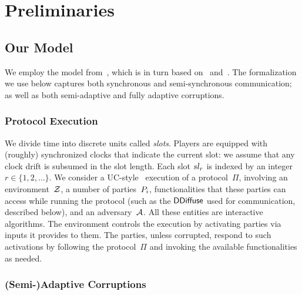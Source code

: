 \section{Preliminaries}


\subsection{Our Model}
\label{sec:model}

We employ the model from~\cite{EC:DGKR18}, which is in turn based
on~\cite{C:KRDO17} and~\cite{EC:GarKiaLeo15}.
The formalization we use below captures both synchronous and semi-syn\-chronous
communication; as well as both semi-adaptive and fully adaptive corruptions.

\subsubsection{Protocol Execution}
\label{sec:prelim-exec}

We divide time into discrete units called
\emph{slots}. %
Players are equipped with (roughly) synchronized clocks that
indicate the current slot: we assume that any clock drift is subsumed in the
slot length.  Each slot $sl_r$ is indexed by an integer $r \in \{1,2,\ldots
\}$.
We consider a UC-style~\cite{FOCS:Canetti01} execution of a protocol~$\Pi$,
involving an environment~$\mathcal{Z}$, a number of
parties~$P_i$, functionalities that these parties can access while running
the protocol (such as the $\mathsf{DDiffuse}$ used for communication, described below), and
an adversary~$\mathcal{A}$. All these entities are interactive algorithms.  The
environment controls the execution by activating parties via inputs it provides
to them. The parties, unless corrupted, respond to such activations by following
the protocol~$\Pi$ and invoking the available functionalities as needed.

\subsubsection{(Semi-)Adaptive Corruptions}
\label{sec:prelim-corr}

